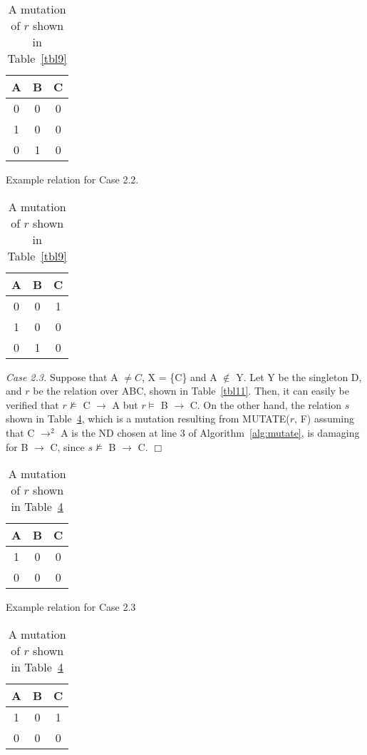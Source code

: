 {\line
\begin{table}[ht]
\begin{minipage}[b]{7cm}
\begin{center}
\begin{tabular}{|c|c|c|} \hline
A & B & C \\ \hline
0 & 0 & 0 \\
1 & 0 & 0 \\ 
0 & 1 & 0 \\ \hline
\end{tabular}
\end{center}
\caption{\label{tbl9} Example relation for Case 2.2.} 
\end{minipage}
\hfill
\begin{minipage}[b]{7cm}
\begin{center}
\begin{tabular}{|c|c|c|} \hline
A & B & C \\ \hline
0 & 0 & 1 \\
1 & 0 & 0 \\ 
0 & 1 & 0 \\ \hline
\end{tabular}
\end{center}
\caption{\label{tbl10} A mutation of $r$ shown in Table~\ref{tbl9}} 
\end{minipage}
\end{table}
}

{\em Case 2.3.}
Suppose that A $\not= C$, X = \{C\} and A $\not\in$ Y. 
Let Y be the singleton D,
and $r$ be the relation over ABC, shown in Table~\ref{tbl11}.
Then, it can easily be verified that 
$r \not\models$ C $\to$ A but $r \models$ B $\to$ C.
On the other hand, the relation $s$ shown in Table~\ref{tbl12},
which is a mutation resulting from MUTATE($r$, F) assuming that 
C $\to^2$ A is the ND chosen at line 3 of Algorithm~\ref{alg:mutate},
is damaging for B $\to$ C, since $s \not\models$ B $\to$ C.
\quad $\Box$
\medskip

{\line
\begin{table}[ht]
\begin{minipage}[b]{7cm}
\begin{center}
\begin{tabular}{|c|c|c|} \hline
A & B & C \\ \hline
1 & 0 & 0 \\
0 & 0 & 0 \\ \hline
\end{tabular}
\end{center}
\caption{\label{tbl11} Example relation for Case 2.3} 
\end{minipage}
\hfill
\begin{minipage}[b]{7cm}
\begin{center}
\begin{tabular}{|c|c|c|} \hline
A & B & C \\ \hline
1 & 0 & 1 \\
0 & 0 & 0 \\ \hline
\end{tabular}
\end{center}
\caption{\label{tbl12} A mutation of $r$ shown in Table~\ref{tbl12}} 
\end{minipage}
\end{table}
}

